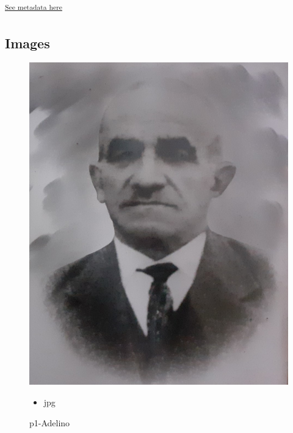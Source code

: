 \documentclass{article}
\begin{document}
        \textsuperscript{\hyperref[table:\arabic{tablecounter}]{See metadata here}}
    



\clearpage



\begin{center}
\section{Images}
\end{center}


	

		\begin{figure}[ht!]
		\begin{minipage}{0.35\textwidth}
			\centering
			\includegraphics[width=\linewidth]{p1-Adelino.jpg}
			\caption{ p1-Adelino }
		\end{minipage}
		\hspace{1cm} %
		\begin{minipage}{0.3\textwidth}
			\begin{tcolorbox}[colback=white, colframe=black, boxrule=1pt]
				\begin{itemize}
					\item jpg
                    
				\end{itemize}

			\end{tcolorbox}
		\end{minipage}
	\end{figure}
	
\end{document}
